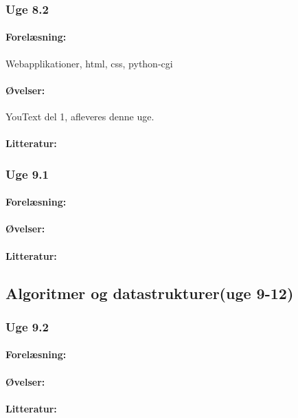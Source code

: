 \documentclass[12pt]{article}
\begin{document}
\subsubsection{Uge 8.2}
\paragraph{Forelæsning:} 
Webapplikationer, html, css, python-cgi
\paragraph{Øvelser:}
YouText del 1, afleveres denne uge.
\paragraph{Litteratur:}

\subsubsection{Uge 9.1}
\paragraph{Forelæsning:}

\paragraph{Øvelser:}
\paragraph{Litteratur:}

\subsection{Algoritmer og datastrukturer(uge 9-12)}
\subsubsection{Uge 9.2}
\paragraph{Forelæsning:} 
\paragraph{Øvelser:}
\paragraph{Litteratur:}
\end{document}
